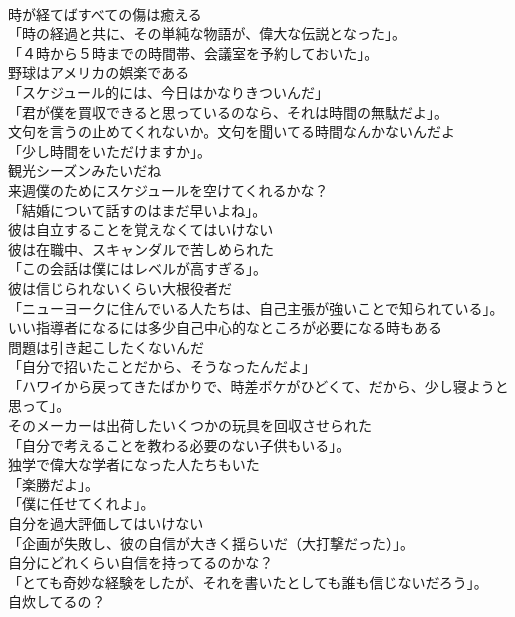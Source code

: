 \documentclass[8pt]{extreport}
\begin{document}
\begin{CJK}{UTF8}{min}
\\	時が経てばすべての傷は癒える	
\\	「時の経過と共に、その単純な物語が、偉大な伝説となった」。	
\\	「４時から５時までの時間帯、会議室を予約しておいた」。	
\\	野球はアメリカの娯楽である	
\\	「スケジュール的には、今日はかなりきついんだ」	
\\	「君が僕を買収できると思っているのなら、それは時間の無駄だよ」。	
\\	文句を言うの止めてくれないか。文句を聞いてる時間なんかないんだよ	
\\	「少し時間をいただけますか」。	
\\	観光シーズンみたいだね	
\\	来週僕のためにスケジュールを空けてくれるかな？	
\\	「結婚について話すのはまだ早いよね」。	
\\	彼は自立することを覚えなくてはいけない	
\\	彼は在職中、スキャンダルで苦しめられた	
\\	「この会話は僕にはレベルが高すぎる」。	
\\	彼は信じられないくらい大根役者だ	
\\	「ニューヨークに住んでいる人たちは、自己主張が強いことで知られている」。	
\\	いい指導者になるには多少自己中心的なところが必要になる時もある	
\\	問題は引き起こしたくないんだ	
\\	「自分で招いたことだから、そうなったんだよ」	
\\	「ハワイから戻ってきたばかりで、時差ボケがひどくて、だから、少し寝ようと思って」。	
\\	そのメーカーは出荷したいくつかの玩具を回収させられた	
\\	「自分で考えることを教わる必要のない子供もいる」。	
\\	独学で偉大な学者になった人たちもいた	
\\	「楽勝だよ」。 
\\	「僕に任せてくれよ」。	
\\	自分を過大評価してはいけない	
\\	「企画が失敗し、彼の自信が大きく揺らいだ（大打撃だった）」。	
\\	自分にどれくらい自信を持ってるのかな？	
\\	「とても奇妙な経験をしたが、それを書いたとしても誰も信じないだろう」。	
\\	自炊してるの？	

\end{CJK}
\end{document}
